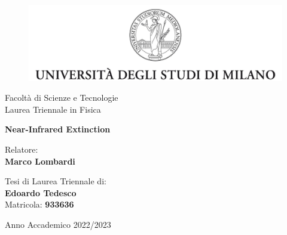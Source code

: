 


\begin{titlepage}
	
\begin{figure}[H]
	\centering
	\includegraphics[width=360pt]{logo_2.jpg}
	\vspace{0.8 cm}
\end{figure}

	
	
\begin{center}{
Facoltà di Scienze e Tecnologie\\
Laurea Triennale in Fisica
}
\end{center}
	
\begin{center}
\vspace{1 cm}
{
\textbf{Near-Infrared Extinction}}
\end{center}
\par
\vspace{2 cm}
	
\begin{flushleft}
Relatore:\\ \textbf{Marco Lombardi}\\
\end{flushleft}
	
\vspace{1 cm}
\begin{flushright}
Tesi di Laurea Triennale di:\\ \textbf{Edoardo Tedesco} \\Matricola: \textbf{933636}
\end{flushright}
	
\vfill
\begin{center}
{\large Anno Accademico 2022/2023}
\end{center}
\end{titlepage}

